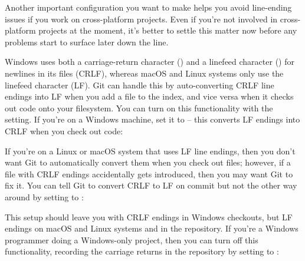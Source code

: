 \begin{flushleft}
\end{flushleft}

\begin{flushleft}
	Another important configuration you want to make helps you avoid line-ending
	issues if you work on cross-platform projects. Even if you're not involved in
	cross-platform projects at the moment, it's better to settle this matter now
	before any problems start to surface later down the line.
\end{flushleft}

\begin{flushleft}
	Windows uses both a carriage-return character (\icli{\carret}) and a linefeed character
	(\icli{\linefeed}) for newlines in its files (CRLF), whereas macOS and Linux systems only
	use the linefeed character (LF). Git can handle this by auto-converting CRLF line endings into LF
	when you add a file to the index, and vice versa when it checks out code onto your filesystem. You
	can turn on this functionality with the  setting. If you’re on a Windows machine,
	set it to  -- this converts LF endings into CRLF when you check out code:
\end{flushleft}

\begin{flushleft}
\end{flushleft}

\begin{flushleft}
	If you're on a Linux or macOS system that uses LF line endings, then you don’t want Git to automatically
	convert them when you check out files; however, if a file with CRLF endings accidentally gets introduced,
	then you may want Git to fix it. You can tell Git to convert CRLF to LF on commit but not the other way
	around by setting  to :
\end{flushleft}

\begin{flushleft}
\end{flushleft}

\begin{flushleft}
	This setup should leave you with CRLF endings in Windows checkouts, but LF endings on macOS and Linux
	systems and in the repository. If you're a Windows programmer doing a Windows-only project, then you
	can turn off this functionality, recording the carriage returns in the repository by setting 
	to :
\end{flushleft}

